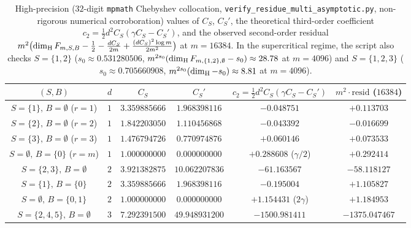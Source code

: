 \begin{table}[ht]
\centering\small\setlength{\tabcolsep}{4.5pt}
\begin{tabular}{c|c|c|c|c|c}
$(S,B)$ & $d$ & $C_S$ & $C_S'$ & $c_2=\frac12 d^2 C_S(\gamma C_S-C_S')$ & $m^2\cdot\mathrm{resid}$ ($16384$) \\\hline
$S=\{1\},\,B=\emptyset$ ($r=1$) & $1$ & $3.359885666$ & $1.968398116$ & $-0.048751$ & $+0.113703$ \\
$S=\{2\},\,B=\emptyset$ ($r=2$) & $1$ & $1.842203050$ & $1.110456868$ & $-0.043392$ & $-0.016699$ \\
$S=\{3\},\,B=\emptyset$ ($r=3$) & $1$ & $1.476794726$ & $0.770974876$ & $+0.060146$ & $+0.073533$ \\
$S=\emptyset,\,B=\{0\}$ ($r=m$) & $1$ & $1.000000000$ & $0.000000000$ & $+0.288608$ ($\gamma/2$) & $+0.292414$ \\\hline
$S=\{2,3\},\,B=\emptyset$ & $2$ & $3.921382875$ & $10.062207836$ & $-61.163567$ & $-58.118127$ \\
$S=\{1\},\,B=\{0\}$ & $2$ & $3.359885666$ & $1.968398116$ & $-0.195004$ & $+1.105827$ \\
$S=\emptyset,\,B=\{0,1\}$ & $2$ & $1.000000000$ & $0.000000000$ & $+1.154431$ ($2\gamma$) & $+1.184953$ \\
$S=\{2,4,5\},\,B=\emptyset$ & $3$ & $7.292391500$ & $49.948931200$ & $-1500.981411$ & $-1375.047467$
\end{tabular}
\caption{High-precision ($32$-digit \texttt{mpmath} Chebyshev collocation, \texttt{verify\_\allowbreak residue\_\allowbreak multi\_\allowbreak asymptotic.py}, non-rigorous numerical corroboration) values of $C_S$, $C_S'$, the theoretical third-order coefficient $c_2=\frac12 d^2 C_S(\gamma C_S-C_S')$, and the observed second-order residual $m^2\bigl(\dim_{\mathrm{H}} F_{m,S,B}-\frac12-\frac{dC_S}{2m}+\frac{(dC_S)^2\log m}{2m^2}\bigr)$ at $m=16384$. In the supercritical regime, the script also checks $S=\{1,2\}$ ($s_0\approx0.531280506$, $m^{2s_0}(\dim_{\mathrm{H}} F_{m,\{1,2\},\emptyset}-s_0)\approx 28.78$ at $m=4096$) and $S=\{1,2,3\}$ ($s_0\approx0.705660908$, $m^{2s_0}(\dim_{\mathrm{H}}-s_0)\approx 8.81$ at $m=4096$).}\label{tab:multi-residue-asymptotic}
\end{table}

